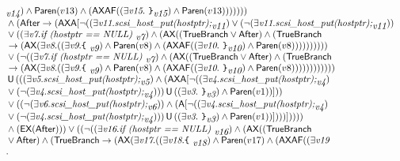 \documentclass{article}
\newcommand{\U}{\,\mbox{\sf{U}}\,}
\newcommand{\A}{\mbox{\sf{A}}}
\newcommand{\AX}{\mbox{\sf{AX}}}
\newcommand{\EX}{\mbox{\sf{EX}}}
\newcommand{\AF}{\mbox{\sf{AF}}}
\newcommand{\mita}[1]{\mbox{\it{{#1}}}}
\newcommand{\msf}[1]{\mbox{\sf{{#1}}}}
\newcommand{\ttlb}{\mbox{\tt \char'173}}
\newcommand{\ttrb}{\mbox{\tt \char'175}}
\begin{document}
\[\begin{array}{l}
{  }_{\mita{v14}}) \wedge \msf{Paren}(v13) \wedge (\AX\AF((\exists \mita{v15} . \mita{
{\ttrb}}_{\mita{v15}}) \wedge \msf{Paren}(v13)))))))\\\mbox{} \wedge (\msf{After} \rightarrow (\AX\A[\neg ((\exists \mita{v11} . \mita{scsi\_host\_put(hostptr);}_{\mita{v11}}) \vee (\neg (\exists \mita{v11} . \mita{scsi\_host\_put(hostptr);}_{\mita{v11}}))\\\mbox{} \vee ((\exists \mita{v7} . \mita{if (hostptr == NULL) }_{\mita{v7}}) \wedge (\AX((\msf{TrueBranch} \vee \msf{After}) \wedge (\msf{TrueBranch}\\\mbox{} \rightarrow (\AX(\exists \mita{v8} . ((\exists \mita{v9} . \mita{{\ttlb}
  }_{\mita{v9}}) \wedge \msf{Paren}(v8) \wedge (\AX\AF((\exists \mita{v10} . \mita{
{\ttrb}}_{\mita{v10}}) \wedge \msf{Paren}(v8))))))))))\\\mbox{} \vee (\neg ((\exists \mita{v7} . \mita{if (hostptr == NULL) }_{\mita{v7}}) \wedge (\AX((\msf{TrueBranch} \vee \msf{After}) \wedge (\msf{TrueBranch}\\\mbox{} \rightarrow (\AX(\exists \mita{v8} . ((\exists \mita{v9} . \mita{{\ttlb}
  }_{\mita{v9}}) \wedge \msf{Paren}(v8) \wedge (\AX\AF((\exists \mita{v10} . \mita{
{\ttrb}}_{\mita{v10}}) \wedge \msf{Paren}(v8))))))))))))\\\mbox{} \U (((\exists \mita{v5} . \mita{scsi\_host\_put(hostptr);}_{\mita{v5}}) \wedge (\AX\A[\neg ((\exists \mita{v4} . \mita{scsi\_host\_put(hostptr);}_{\mita{v4}})\\\mbox{} \vee (\neg (\exists \mita{v4} . \mita{scsi\_host\_put(hostptr);}_{\mita{v4}}))) \U ((\exists \mita{v3} . \mita{
{\ttrb}}_{\mita{v3}}) \wedge \msf{Paren}(v1))]
))\\\mbox{} \vee ((\neg (\exists \mita{v6} . \mita{scsi\_host\_put(hostptr);}_{\mita{v6}})) \wedge (\A[\neg ((\exists \mita{v4} . \mita{scsi\_host\_put(hostptr);}_{\mita{v4}})\\\mbox{} \vee (\neg (\exists \mita{v4} . \mita{scsi\_host\_put(hostptr);}_{\mita{v4}}))) \U ((\exists \mita{v3} . \mita{
{\ttrb}}_{\mita{v3}}) \wedge \msf{Paren}(v1))]
)))]
))))\\\mbox{} \wedge (\EX(\msf{After}))) \vee ((\neg ((\exists \mita{v16} . \mita{if (hostptr == NULL) }_{\mita{v16}}) \wedge (\AX((\msf{TrueBranch}\\\mbox{} \vee \msf{After}) \wedge (\msf{TrueBranch} \rightarrow (\AX(\exists \mita{v17} . ((\exists \mita{v18} . \mita{{\ttlb}
  }_{\mita{v18}}) \wedge \msf{Paren}(v17) \wedge (\AX\AF((\exists \mita{v19}\\\mbox{} . \mita{
}
\end{array}\]
\end{document}
